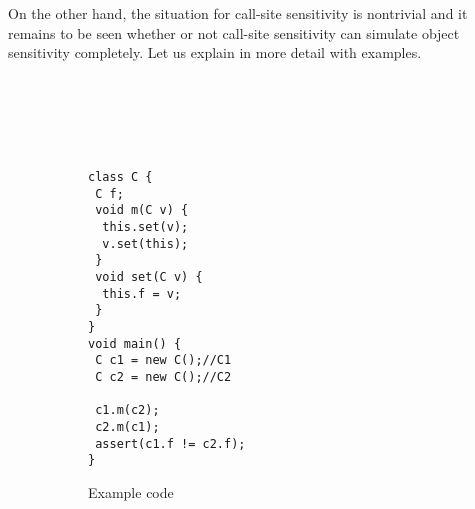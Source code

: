 


On the other hand, the situation for call-site sensitivity is nontrivial and it remains to be seen whether or not call-site sensitivity can simulate object sensitivity completely. 
Let us explain in more detail with examples.



\begin{figure}[t]
\begin{multicols}{2}
~\\\\\\\\
\begin{subfigure}[b]{1.2\columnwidth}
\begin{lstlisting}[xleftmargin=13pt,multicols=2,basicstyle={\fontsize{8.5}{10}\selectfont\ttfamily}]
class C {
 C f;
 void m(C v) {
  this.set(v);
  v.set(this);
 }
 void set(C v) {
  this.f = v;
 }
}
void main() {
 C c1 = new C();//C1
 C c2 = new C();//C2

 c1.m(c2);
 c2.m(c1);
 assert(c1.f != c2.f); 
}
\end{lstlisting}
\caption{Example code}
\label{fig:counterexample:code}
\end{subfigure}
\columnbreak~\\


\quad\begin{subfigure}[b]{1.0\columnwidth}
\begin{center}
\end{center}
\end{subfigure}
\end{multicols}
\end{figure}
